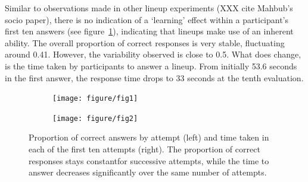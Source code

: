 \documentclass{article}\usepackage[]{graphicx}\usepackage[]{color}
\newenvironment{knitrout}{}{} %
\begin{document}
Similar to observations made in other lineup experiments (XXX cite Mahbub's socio paper), there is no indication of a `learning' effect within a participant's first ten answers (see figure~\ref{fig:attempts}), indicating that lineups make use of an inherent ability. The overall proportion of correct responses is very stable, fluctuating around 0.41. However, the variability observed is close to 0.5. What does change, is the time taken by participants to answer a lineup. From initially 53.6 seconds in the first answer, the response time drops to 33 seconds at the tenth evaluation.
\begin{figure}
\centering
\begin{subfigure}[b]{.5\linewidth}
\begin{knitrout}
\color{fgcolor}
\texttt{[image: figure/fig1]} 

\end{knitrout}

\end{subfigure}
\begin{subfigure}[b]{.5\linewidth}
\begin{knitrout}
\color{fgcolor}
\texttt{[image: figure/fig2]} 

\end{knitrout}

\end{subfigure}
\caption{\label{fig:attempts}Proportion of correct answers by attempt (left) and time taken in each of the first ten attempts (right). The proportion of correct responses stays constantfor successive attempts, while the time to answer decreases significantly over the same number of attempts.}
\end{figure}


\end{document}
